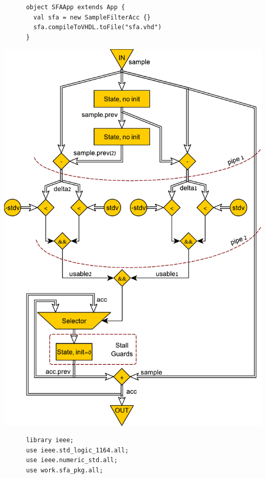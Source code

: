 \begin{table}[t!]
\begin{minipage}[t][6.8cm][t]{0.46\linewidth}
\begin{verbatim}
      object SFAApp extends App {
        val sfa = new SampleFilterAcc {}
        sfa.compileToVHDL.toFile("sfa.vhd")
      }
    \end{verbatim}
    \label{fig:SFADFiant}
    \vspace{1cm}
    \includegraphics[width=\linewidth]{graphics/sfa.pdf}
  \end{minipage}
  \hfill
  \begin{minipage}[t][22cm][t]{0.51\linewidth}
    \centering
    \begin{verbatim}
      library ieee;
      use ieee.std_logic_1164.all;
      use ieee.numeric_std.all;
      use work.sfa_pkg.all;
      

\end{verbatim}
\end{minipage}
\end{table}
